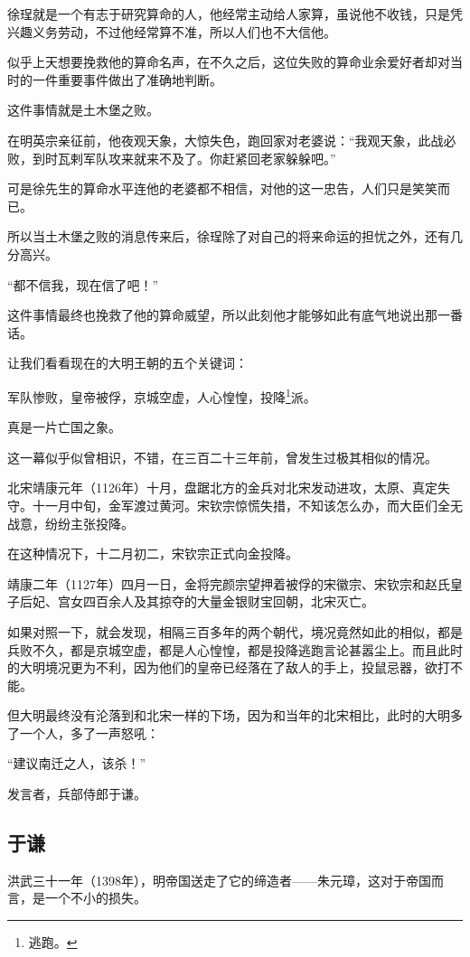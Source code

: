 \begin{multicols}{\theparacolNo}
徐珵就是一个有志于研究算命的人，他经常主动给人家算，虽说他不收钱，只是凭兴趣义务劳动，不过他经常算不准，所以人们也不大信他。

似乎上天想要挽救他的算命名声，在不久之后，这位失败的算命业余爱好者却对当时的一件重要事件做出了准确地判断。

这件事情就是土木堡之败。

在明英宗亲征前，他夜观天象，大惊失色，跑回家对老婆说：“我观天象，此战必败，到时瓦剌军队攻来就来不及了。你赶紧回老家躲躲吧。”

可是徐先生的算命水平连他的老婆都不相信，对他的这一忠告，人们只是笑笑而已。

所以当土木堡之败的消息传来后，徐珵除了对自己的将来命运的担忧之外，还有几分高兴。

“都不信我，现在信了吧！”

这件事情最终也挽救了他的算命威望，所以此刻他才能够如此有底气地说出那一番话。

让我们看看现在的大明王朝的五个关键词：

军队惨败，皇帝被俘，京城空虚，人心惶惶，投降\footnote{逃跑。}派。

真是一片亡国之象。

这一幕似乎似曾相识，不错，在三百二十三年前，曾发生过极其相似的情况。

北宋靖康元年（1126年）十月，盘踞北方的金兵对北宋发动进攻，太原、真定失守。十一月中旬，金军渡过黄河。宋钦宗惊慌失措，不知该怎么办，而大臣们全无战意，纷纷主张投降。

在这种情况下，十二月初二，宋钦宗正式向金投降。

靖康二年（1127年）四月一日，金将完颜宗望押着被俘的宋徽宗、宋钦宗和赵氏皇子后妃、宫女四百余人及其掠夺的大量金银财宝回朝，北宋灭亡。

如果对照一下，就会发现，相隔三百多年的两个朝代，境况竟然如此的相似，都是兵败不久，都是京城空虚，都是人心惶惶，都是投降逃跑言论甚嚣尘上。而且此时的大明境况更为不利，因为他们的皇帝已经落在了敌人的手上，投鼠忌器，欲打不能。

但大明最终没有沦落到和北宋一样的下场，因为和当年的北宋相比，此时的大明多了一个人，多了一声怒吼：

“建议南迁之人，该杀！”

发言者，兵部侍郎于谦。

\subsection{于谦}
洪武三十一年（1398年），明帝国送走了它的缔造者——朱元璋，这对于帝国而言，是一个不小的损失。


\end{multicols}
